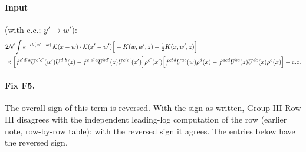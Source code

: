 \documentclass[10pt]{article}
\numberwithin{equation}{section}
\newcommand{\KK}{\mathcal K}
\newcommand{\NN}{\mathcal N}
\begin{document}
\paragraph{Input} (with c.c.; $y'\to w'$):
\begin{align}
&2\NN\int e^{-ik(w'-w)}\,\KK(x-w)\cdot\KK(x'-w')\Big[-K(w,w',z)+\tfrac12K(x,w',z)\Big]\notag\\
&\times\Big[f^{c'd'a}U^{e'c'}(w')U^{d'b}(z)-f^{c'd'a}U^{bd'}(z)U^{c'e'}(x')\Big]\rho^{e'}(x')\Big[f^{cbd}U^{ac}(w)\rho^d(x)-f^{acd}U^{bc}(z)U^{de}(x)\rho^e(x)\Big]+{\rm c.c.}
\end{align}
\paragraph{Fix F5.} The overall sign of this term is reversed. With the sign as written, Group III Row III disagrees with the independent leading-log computation of the row (earlier note, row-by-row table); with the reversed sign it agrees. The entries below have the reversed sign.
\end{document}
